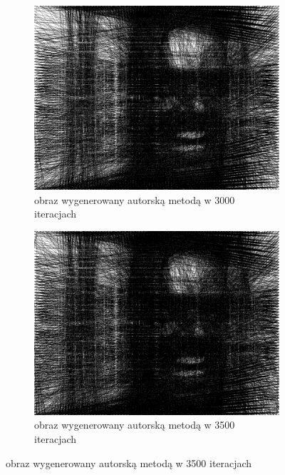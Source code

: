 \documentclass[a4paper, 12pt, polish, twoside]{extreport}
\begin{document}
\begin{figure}[H]
\begin{subfigure}{0.24\textwidth}
        \label{comp-comp-joker-shining-h}
    \end{subfigure}
    \begin{subfigure}{0.24\textwidth}
        \centering
        \includegraphics[width = \textwidth]{img/6-comp/shining_r_i3000_c20_inv0_bg10_obj1_ed1.png}
        \caption{obraz wygenerowany autorską metodą w 3000 iteracjach}
        \label{comp-comp-joker-shining-i}
    \end{subfigure}
    \begin{subfigure}{0.24\textwidth}
        \centering
        \includegraphics[width = \textwidth]{img/6-comp/shining_r_i3500_c20_inv0_bg10_obj1_ed1.png}
        \caption{obraz wygenerowany autorską metodą w 3500 iteracjach}

\end{subfigure}
\end{figure}
\end{document}
